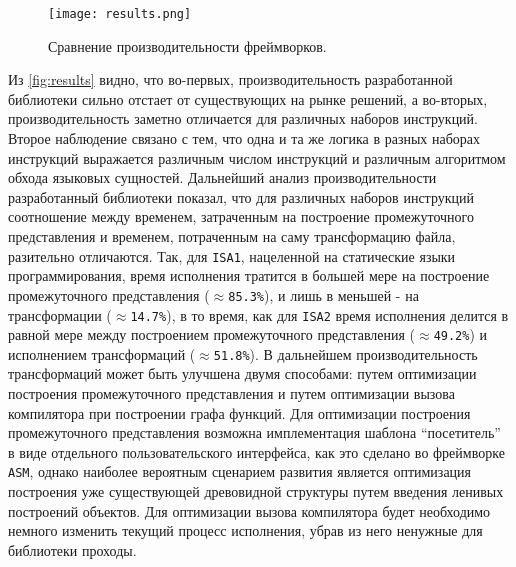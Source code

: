 \begin{figure}[h]
\centering
\texttt{[image: results.png]}
\caption{Сравнение производительности фреймворков.}
\label{fig:results}
\end{figure}

Из \autoref{fig:results} видно, что во-первых, производительность разработанной библиотеки сильно отстает от существующих на рынке решений, а во-вторых, производительность заметно отличается для различных наборов инструкций. Второе наблюдение связано с тем, что одна и та же логика в разных наборах инструкций выражается различным числом инструкций и различным алгоритмом обхода языковых сущностей. Дальнейший анализ производительности разработанный библиотеки показал, что для различных наборов инструкций соотношение между временем, затраченным на построение промежуточного представления и временем, потраченным на саму трансформацию файла, разительно отличаются. Так, для \texttt{ISA1}, нацеленной на статические языки программирования, время исполнения тратится в большей мере на построение промежуточного представления (\texttt{$\approx$85.3\%}), и лишь в меньшей - на трансформации (\texttt{$\approx$14.7\%}), в то время, как для \texttt{ISA2} время исполнения делится в равной мере между построением промежуточного представления (\texttt{$\approx$49.2\%}) и исполнением трансформаций (\texttt{$\approx$51.8\%}). В дальнейшем производительность трансформаций может быть улучшена двумя способами: путем оптимизации построения промежуточного представления и путем оптимизации вызова компилятора при построении графа функций. Для оптимизации построения промежуточного представления возможна имплементация шаблона ``посетитель'' в виде отдельного пользовательского интерфейса, как это сделано во фреймворке \texttt{ASM}, однако наиболее вероятным сценарием развития является оптимизация построения уже существующей древовидной структуры путем введения ленивых построений объектов. Для оптимизации вызова компилятора будет необходимо немного изменить текущий процесс исполнения, убрав из него ненужные для библиотеки проходы.
